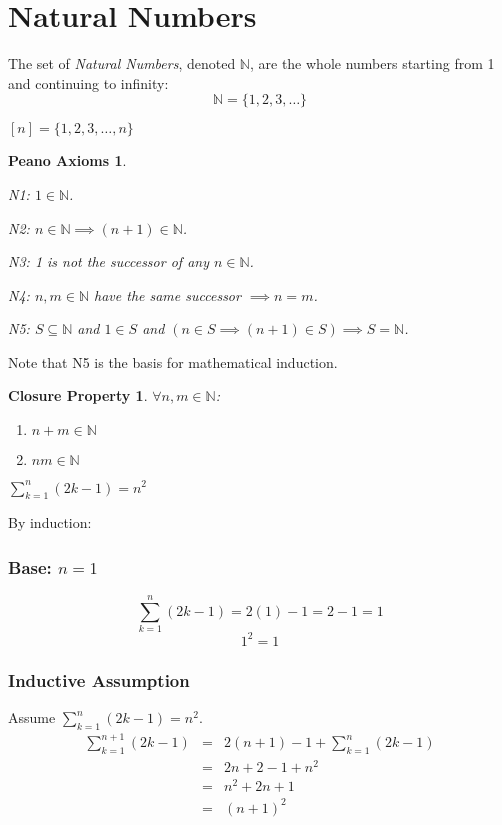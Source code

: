 \documentclass[letterpaper,12pt,fleqn]{article}
\begin{document}
\section*{Natural Numbers}

\begin{definition}
The set of \emph{Natural Numbers}, denoted $\mathbb{N}$, are the whole numbers
starting from 1 and continuing to infinity:
\[\mathbb{N}=\{1, 2, 3, \ldots\}\]
\end{definition}

\begin{notation}{}
$[n]=\{1, 2, 3, \ldots, n\}$
\end{notation}

\theoremstyle{mathitem}
\newtheorem*{peano}{Peano Axioms}
\begin{peano}
\listbreak
\begin{description}
\item{N1: } $1\in\mathbb{N}$.
\item{N2: } $n\in\mathbb{N}\implies(n+1)\in\mathbb{N}$.
\item{N3: } 1 is not the successor of any $n\in\mathbb{N}$.
\item{N4: } $n,m\in\mathbb{N}$ have the same successor $\implies n=m$.
\item{N5: } $S\subseteq\mathbb{N}$ and $1\in S$ and
$(n\in S\implies (n+1)\in S)\implies S=\mathbb{N}$.
\end{description}
\end{peano}

Note that N5 is the basis for mathematical induction.

\newtheorem*{closure}{Closure Property}
\begin{closure}
$\forall n,m\in\mathbb{N}$:
\begin{enumerate}
\item $n+m\in\mathbb{N}$
\item $nm\in\mathbb{N}$
\end{enumerate}
\end{closure}

\begin{theorem}
$\sum_{k=1}^n(2k-1)=n^2$
\end{theorem}

\begin{theproof}
By induction:
\subsubsection*{Base: $n=1$}
\[\sum_{k=1}^n(2k-1)=2(1)-1=2-1=1\]
\[1^2=1\]

\subsubsection*{Inductive Assumption}
Assume $\sum_{k=1}^n(2k-1)=n^2$.
\begin{eqnarray*}
\sum_{k=1}^{n+1}(2k-1) &=& 2(n+1)-1+\sum_{k=1}^n(2k-1) \\
    &=& 2n+2-1+n^2 \\
    &=& n^2+2n+1 \\
    &=& (n+1)^2 \\
\end{eqnarray*}

\end{theproof}
\end{document}
